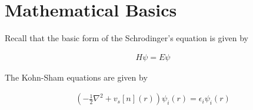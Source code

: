 \documentclass[book.tex]{subfiles}
\begin{document}


\section{Mathematical Basics}


Recall that the basic form of the Schrodinger's equation is given by

\begin{align}
    H \psi = E \psi
\end{align}

The Kohn-Sham equations are given by

\begin{align}
    \left ( -\frac{1}{2} \nabla^2 + v_s[n](r)\right ) \psi_i(r) = \epsilon_i \psi_i(r)
\end{align}
\end{document}
